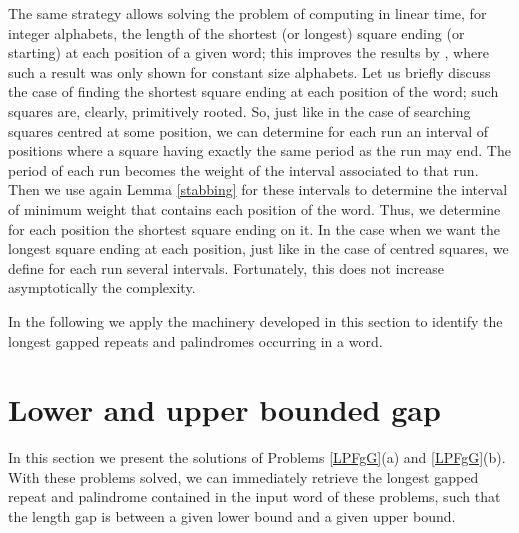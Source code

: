 \documentclass[final]{dmtcs-episciences}
\begin{document}
The same strategy allows solving the problem of computing in linear time, for integer alphabets, the length of the shortest (or longest) square ending (or starting) at each position of a given word; this improves the results by  \cite{kosarajuCPM,XuCPM}, where such a result was only shown for constant size alphabets. Let us briefly discuss the case of finding the shortest square ending at each position of the word; such squares are, clearly,  primitively rooted. So, just like in the case of searching squares centred at some position, we can determine for each run an interval of positions where a square having exactly the same period as the run may end. The period of each run becomes the weight of the interval associated to that run. Then we use again Lemma \ref{stabbing}  for these intervals to determine the interval of minimum weight that contains each position of the word. Thus, we determine for each position the shortest square ending on it. In the case when we want the longest square ending at each position, just like in the case of centred squares, we define for each run several intervals. Fortunately, this does not increase asymptotically the complexity.

In the following we apply the machinery developed in this section to identify the longest gapped repeats and palindromes occurring in a word.


\section{Lower and upper bounded gap}
In this section we present the solutions of Problems \ref{LPFgG}(a) and \ref{LPFgG}(b). With these problems solved, we can immediately retrieve the longest gapped repeat and palindrome contained in the input word of these problems, such that the length gap is between a given lower bound and a given upper bound.
\end{document}
